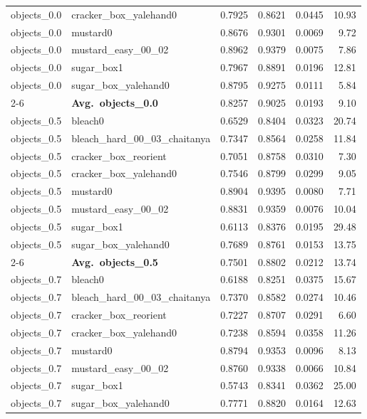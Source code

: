 \begin{longtable}{llrrrr}
  objects_0.0 & cracker\_box\_yalehand0 & 0.7925 & 0.8621 & 0.0445 & 10.93 \\
  objects_0.0 & mustard0 & 0.8676 & 0.9301 & 0.0069 & 9.72 \\
  objects_0.0 & mustard\_easy\_00\_02 & 0.8962 & 0.9379 & 0.0075 & 7.86 \\
  objects_0.0 & sugar\_box1 & 0.7967 & 0.8891 & 0.0196 & 12.81 \\
  objects_0.0 & sugar\_box\_yalehand0 & 0.8795 & 0.9275 & 0.0111 & 5.84 \\
  \cmidrule{2-6}
  & \textbf{Avg.~objects_0.0} & 0.8257 & 0.9025 & 0.0193 & 9.10 \\
  \midrule
  objects_0.5 & bleach0 & 0.6529 & 0.8404 & 0.0323 & 20.74 \\
  objects_0.5 & bleach\_hard\_00\_03\_chaitanya & 0.7347 & 0.8564 & 0.0258 & 11.84 \\
  objects_0.5 & cracker\_box\_reorient & 0.7051 & 0.8758 & 0.0310 & 7.30 \\
  objects_0.5 & cracker\_box\_yalehand0 & 0.7546 & 0.8799 & 0.0299 & 9.05 \\
  objects_0.5 & mustard0 & 0.8904 & 0.9395 & 0.0080 & 7.71 \\
  objects_0.5 & mustard\_easy\_00\_02 & 0.8831 & 0.9359 & 0.0076 & 10.04 \\
  objects_0.5 & sugar\_box1 & 0.6113 & 0.8376 & 0.0195 & 29.48 \\
  objects_0.5 & sugar\_box\_yalehand0 & 0.7689 & 0.8761 & 0.0153 & 13.75 \\
  \cmidrule{2-6}
  & \textbf{Avg.~objects_0.5} & 0.7501 & 0.8802 & 0.0212 & 13.74 \\
  \midrule
  objects_0.7 & bleach0 & 0.6188 & 0.8251 & 0.0375 & 15.67 \\
  objects_0.7 & bleach\_hard\_00\_03\_chaitanya & 0.7370 & 0.8582 & 0.0274 & 10.46 \\
  objects_0.7 & cracker\_box\_reorient & 0.7227 & 0.8707 & 0.0291 & 6.60 \\
  objects_0.7 & cracker\_box\_yalehand0 & 0.7238 & 0.8594 & 0.0358 & 11.26 \\
  objects_0.7 & mustard0 & 0.8794 & 0.9353 & 0.0096 & 8.13 \\
  objects_0.7 & mustard\_easy\_00\_02 & 0.8760 & 0.9338 & 0.0066 & 10.84 \\
  objects_0.7 & sugar\_box1 & 0.5743 & 0.8341 & 0.0362 & 25.00 \\
  objects_0.7 & sugar\_box\_yalehand0 & 0.7771 & 0.8820 & 0.0164 & 12.63 \\

\end{longtable}
